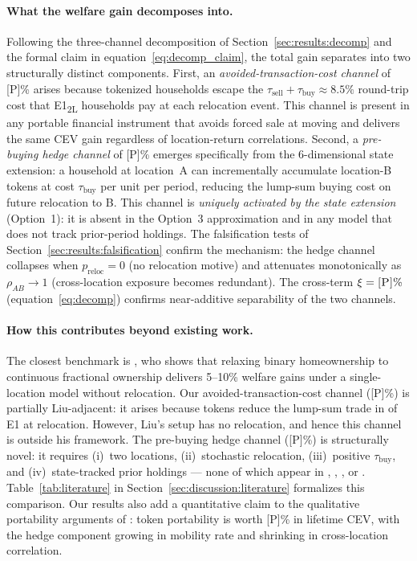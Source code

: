 \paragraph{What the welfare gain decomposes into.}
Following the three-channel decomposition of Section~\ref{sec:results:decomp}
and the formal claim in equation~\eqref{eq:decomp_claim}, the total gain
separates into two structurally distinct components.
First, an \emph{avoided-transaction-cost channel} of \textsc{[P]}\% arises
because tokenized households escape the $\tau_{\text{sell}} + \tau_{\text{buy}}
\approx 8.5\%$ round-trip cost that E1\textsubscript{2L} households pay at
each relocation event.
This channel is present in any portable financial instrument that avoids
forced sale at moving and delivers the same CEV gain regardless of
location-return correlations.
Second, a \emph{pre-buying hedge channel} of \textsc{[P]}\% emerges
specifically from the 6-dimensional state extension: a household at location~A
can incrementally accumulate location-B tokens at cost $\tau_{\text{buy}}$
per unit per period, reducing the lump-sum buying cost on future relocation
to B.
This channel is \emph{uniquely activated by the state extension} (Option~1):
it is absent in the Option~3 approximation and in any model that does not
track prior-period holdings.
The falsification tests of Section~\ref{sec:results:falsification} confirm the
mechanism: the hedge channel collapses when $p_{\text{reloc}} = 0$ (no
relocation motive) and attenuates monotonically as $\rho_{AB} \to 1$
(cross-location exposure becomes redundant).
The cross-term $\xi = \textsc{[P]}\%$ (equation~\eqref{eq:decomp}) confirms
near-additive separability of the two channels.

\paragraph{How this contributes beyond existing work.}
The closest benchmark is \citet{Liu2021}, who shows that relaxing binary
homeownership to continuous fractional ownership delivers 5--10\% welfare
gains under a single-location model without relocation.
Our avoided-transaction-cost channel (\textsc{[P]}\%) is partially Liu-adjacent:
it arises because tokens reduce the lump-sum trade in of E1 at relocation.
However, Liu's setup has no relocation, and hence this channel is outside his
framework.
The pre-buying hedge channel (\textsc{[P]}\%) is structurally novel: it
requires (i)~two locations, (ii)~stochastic relocation, (iii)~positive
$\tau_{\text{buy}}$, and (iv)~state-tracked prior holdings --- none of which
appear in \citet{Liu2021}, \citet{YaoZhang2005}, \citet{Cocco2005}, or
\citet{KMW2018}.
Table~\ref{tab:literature} in Section~\ref{sec:discussion:literature}
formalizes this comparison.
Our results also add a quantitative claim to the qualitative portability
arguments of \citet{SinaiSouleles2005}: token portability is worth \textsc{[P]}\%
in lifetime CEV, with the hedge component growing in mobility rate and
shrinking in cross-location correlation.

